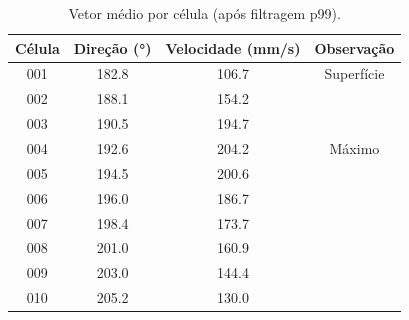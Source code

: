 \documentclass[a4paper,12pt]{article}
\begin{document}
\begin{table}[H]
\centering
\begin{tabular}{cccc}
\toprule
Célula & Direção (°) & Velocidade (mm/s) & Observação \\
\midrule
001 & 182.8 & 106.7 & Superfície \\
002 & 188.1 & 154.2 &  \\
003 & 190.5 & 194.7 &  \\
004 & 192.6 & 204.2 & Máximo \\
005 & 194.5 & 200.6 &  \\
006 & 196.0 & 186.7 &  \\
007 & 198.4 & 173.7 &  \\
008 & 201.0 & 160.9 &  \\
009 & 203.0 & 144.4 &  \\
010 & 205.2 & 130.0 &  \\
\bottomrule
\end{tabular}
\caption{Vetor médio por célula (após filtragem p99).}
\end{table}
\end{document}

